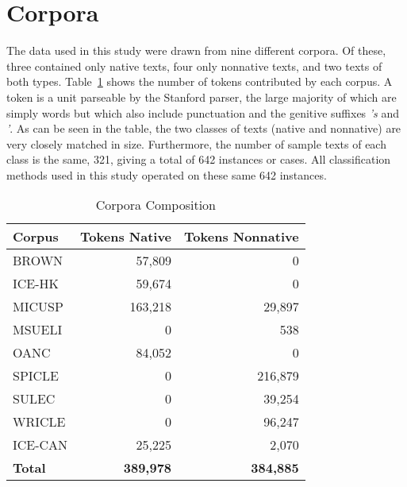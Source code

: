 \documentclass[main.tex]{subfiles}
\begin{document}
\section{Corpora}
\setcounter{section}{3}

The data used in this study were drawn from nine different corpora. Of these, three contained only native texts, four only nonnative texts, and two texts of both types. Table~\ref{table:corpora} shows the number of tokens contributed by each corpus. A token is a unit parseable by the Stanford parser, the large majority of which are simply words but which also include punctuation and the genitive suffixes \textit{'s} and \textit{'}. As can be seen in the table, the two classes of texts (native and nonnative) are very closely matched in size. Furthermore, the number of sample texts of each class is the same, 321, giving a total of 642 instances or cases. All classification methods used in this study operated on these same 642 instances.

\begin{table}[htbp]
\small
\centering
\caption{Corpora Composition}
  \begin{tabular}{  l  r  r }
  \toprule
    Corpus & Tokens Native & Tokens Nonnative \\ \midrule
    BROWN & 57,809 & 0 \\
    [6pt]ICE-HK & 59,674 & 0 \\
    [6pt]MICUSP & 163,218  & 29,897 \\
    [6pt]MSUELI & 0 & 538 \\
    [6pt]OANC & 84,052 & 0 \\
    [6pt]SPICLE & 0 & 216,879 \\
    [6pt]SULEC & 0 & 39,254 \\
    [6pt]WRICLE & 0 & 96,247  \\
    [6pt]ICE-CAN & 25,225 & 2,070 \\
    [6pt]\textbf{Total} & \textbf{389,978} & \textbf{384,885}  \\
    \bottomrule
  \end{tabular}
\label{table:corpora}
\end{table}
\end{document}
